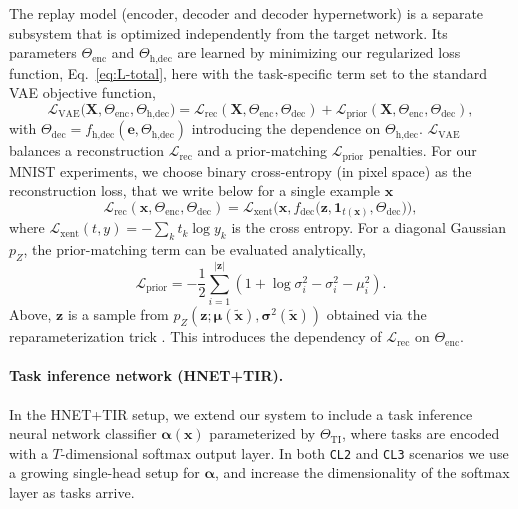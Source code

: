 \documentclass{article}
\begin{document}
The replay model (encoder, decoder and decoder hypernetwork) is a separate subsystem that is optimized independently from the target network. Its parameters $\Theta_\text{enc}$ and $\Theta_\text{h,dec}$ are learned by minimizing our regularized loss function, Eq.~\ref{eq:L-total}, here with the task-specific term set to the standard VAE objective function,
\begin{equation}
  \label{eq:per-sample-LRR}
  \mathcal{L}_\text{VAE}\big(\mathbf{X}, \Theta_\text{enc}, \Theta_\text{h,dec} \big) = 
  \mathcal{L}_\text{rec}(\mathbf{X}, \Theta_\text{enc}, \Theta_\text{dec} )
  + \mathcal{L}_\text{prior} (\mathbf{X}, \Theta_\text{enc}, \Theta_\text{dec}),
\end{equation}
with $\Theta_\text{dec} = f_\text{h,dec}(\mathbf{e}, \Theta_\text{h,dec})$ introducing the dependence on $\Theta_\text{h,dec}$. $\mathcal{L}_\text{VAE}$ balances a reconstruction $\mathcal{L}_\text{rec}$ and a prior-matching $\mathcal{L}_\text{prior}$ penalties. For our MNIST experiments, we choose binary cross-entropy (in pixel space) as the reconstruction loss, that we write below for a single example $\mathbf{x}$
\begin{equation}
\mathcal{L}_\text{rec} (\mathbf{x}, \Theta_\text{enc}, \Theta_\text{dec}) = \mathcal{L}_\text{xent}\big(\mathbf{x}, f_\text{dec} \big( \mathbf{z}, \boldsymbol 1_{t(\mathbf{x})}, \Theta_\text{dec} \big) \big),
\end{equation}
where $\mathcal{L}_\text{xent}(t,y) = -\sum_k t_k \log y_k$ is the cross entropy. For a diagonal Gaussian $p_Z$, the prior-matching term can be evaluated analytically,
\begin{equation}
  \mathcal{L}_\text{prior} = -\frac{1}{2} \sum_{i=1}^{|\mathbf{z}|} \left( 1 + \log \sigma_i^2 - \sigma_i^2 - \mu_i^2 \right).
\end{equation}
Above, $\mathbf{z}$ is a sample from $p_Z(\mathbf{z}; \boldsymbol\mu(\tilde{\mathbf{x}}), \boldsymbol\sigma^2(\tilde{\mathbf{x}}))$ obtained via the reparameterization trick \citep{kingma_auto-encoding_2014,rezende_stochastic_2014}. This introduces the dependency of $\mathcal{L}_\text{rec}$ on $\Theta_\text{enc}$.

\paragraph{Task inference network (HNET+TIR).} In the HNET+TIR setup, we extend our system to include a task inference neural network classifier $\boldsymbol\alpha(\mathbf{x})$ parameterized by $\Theta_\text{TI}$, where tasks are encoded with a $T$-dimensional softmax output layer. In both \texttt{CL2} and \texttt{CL3} scenarios we use a growing single-head setup for $\boldsymbol\alpha$, and increase the dimensionality of the softmax layer as tasks arrive.
\end{document}
